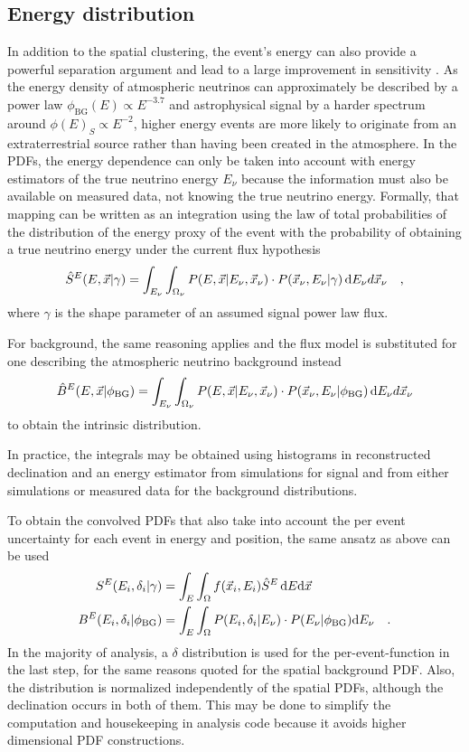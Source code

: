 \subsection{Energy distribution}
In addition to the spatial clustering, the event's energy can also provide a powerful separation argument and lead to a large improvement in sensitivity .
As the energy density of atmospheric neutrinos can approximately be described by a power law $\phi_\mathrm{BG}(E) \propto E^{-3.7}$ and astrophysical signal by a harder spectrum around $\phi(E)_S \propto E^{-2}$, higher energy events are more likely to originate from an extraterrestrial source rather than having been created in the atmosphere.
In the PDFs, the energy dependence can only be taken into account with energy estimators of the true neutrino energy $E_\nu$ because the information must also be available on measured data, not knowing the true neutrino energy.
Formally, that mapping can be written as an integration using the law of total probabilities of the distribution of the energy proxy of the event with the probability of obtaining a true neutrino energy under the current flux hypothesis
\begin{equation}
  \hat{S}^E(E, \vec{x}|\gamma) =
    \int_{E_\nu}\int_{\Omega_\nu}
    P(E, \vec{x}|E_\nu, \vec{x}_\nu) \cdot P(\vec{x}_\nu, E_\nu|\gamma)
    \,\mathrm{d}E_\nu d{\vec{x}_\nu}
    \quad\text{,}
\end{equation}
where $\gamma$ is the shape parameter of an assumed signal power law flux.

For background, the same reasoning applies and the flux model is substituted for one describing the atmospheric neutrino background instead
\begin{equation}
  \hat{B}^E(E, \vec{x}|\phi_\mathrm{BG}) =
    \int_{E_\nu}\int_{\Omega_\nu}
    P(E, \vec{x}|E_\nu, \vec{x}_\nu) \cdot P(\vec{x}_\nu, E_\nu|\phi_\mathrm{BG})
    \,\mathrm{d}E_\nu d{\vec{x}_\nu}
\end{equation}
to obtain the intrinsic distribution.

In practice, the integrals may be obtained using histograms in reconstructed declination and an energy estimator from simulations for signal and from either simulations or measured data for the background distributions.

To obtain the convolved PDFs that also take into account the per event uncertainty for each event in energy and position, the same ansatz as above can be used
\begin{align}
  S^E(E_i, \delta_i|\gamma) &=
    \int_E\int_\Omega f(\vec{x}_i, E_i)\hat{S}^E\,\mathrm{d}E\mathrm{d}\vec{x} \\
  B^E(E_i, \delta_i|\phi_\mathrm{BG}) &=
    \int_E\int_\Omega P(E_i,\delta_i|E_\nu)\cdot P(E_\nu|\phi_\mathrm{BG})
      \mathrm{d}E_\nu
    \quad\text{.}
\end{align}
In the majority of analysis, a $\delta$ distribution is used for the per-event-function in the last step, for the same reasons quoted for the spatial background PDF.
Also, the distribution is normalized independently of the spatial PDFs, although the declination occurs in both of them.
This may be done to simplify the computation and housekeeping in analysis code because it avoids higher dimensional PDF constructions.

